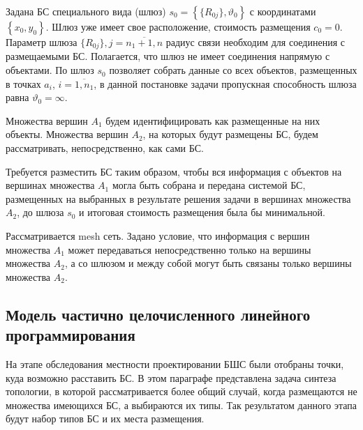 
Задана БС специального вида (шлюз) $s_0 = \left\{ \{R_{0j}\}, \vartheta_0 \right\}$ с координатами $\left\{x_0, y_0 \right\}$. Шлюз уже имеет свое расположение, стоимость размещения $c_0 = 0$. Параметр шлюза $\{R_{0j}\}, j = \overline{n_1+1,n}$ радиус связи необходим для соединения с размещаемыми БС. Полагается, что шлюз не имеет соединения напрямую с объектами. По шлюз $s_0$ позволяет собрать данные со всех объектов, размещенных в точках $a_i$, $i= \overline{1,n_1}$, в данной постановке задачи пропускная способность шлюза равна $\vartheta_0 = \infty$.


Множества вершин $A_1$ будем идентифицировать как размещенные на них объекты. Множества вершин $A_2$, на которых будут размещены БС, будем рассматривать, непосредственно, как сами БС. 

Требуется разместить БС таким образом, чтобы вся информация с объектов на вершинах множества $A_1$ могла быть собрана и передана системой БС, размещенных на выбранных в результате решения задачи в вершинах множества  $A_2$, до шлюза $s_0$ и итоговая стоимость размещения была бы минимальной.


Рассматривается mesh сеть. Задано условие, что информация с вершин множества $A_1$ может передаваться непосредственно только на вершины множества $A_2$, а со шлюзом и между собой могут быть связаны только вершины множества $A_2$.

\subsection{Модель частично целочисленного линейного программирования}

На этапе обследования местности проектировании БШС были отобраны точки, куда возможно расставить БС. В этом параграфе представлена задача синтеза топологии, в которой рассматривается более общий случай, когда размещаются не множества имеющихся БС, а выбираются их типы. Так результатом данного этапа будут набор типов БС и их места размещения.


